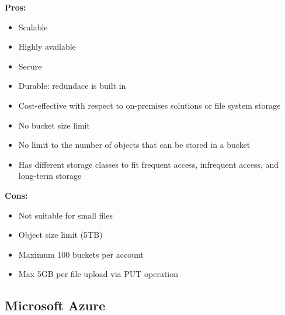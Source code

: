         \textbf{Pros:}
        \begin{itemize}
            \item Scalable
            \item Highly available
            \item Secure
            \item Durable: redundace is built in
            \item Cost-effective with respect to on-premises solutions or file system storage
            \item No bucket size limit
            \item No limit to the number of objects that can be stored in a bucket
            \item Has different storage classes to fit frequent access, infrequent access, and long-term storage
        \end{itemize}
        \textbf{Cons:}
        \begin{itemize}
            \item Not suitable for small files
            \item Object size limit (5TB)
            \item Maximum 100 buckets per account
            \item Max 5GB per file upload via PUT operation
        \end{itemize}


    \subsection{Microsoft Azure}
    
